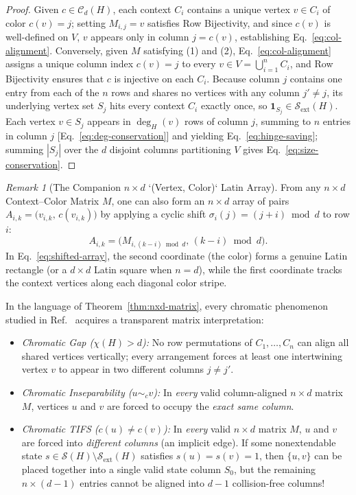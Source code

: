 \documentclass[aps,pra,reprint,superscriptaddress,longbibliography,nofootinbib,floatfix,10pt]{revtex4-2}
\theoremstyle{definition}\newtheorem{definition}[theorem]{Definition}
\theoremstyle{remark}\newtheorem{remark}[theorem]{Remark}
\newcommand{\Sc}{\mathcal S}\newcommand{\Cc}{\mathcal C}
\begin{document}
\begin{proof}
Given $c\in\Cc_d(H)$, each context $C_i$ contains a unique vertex $v\in C_i$ of color $c(v)=j$; setting $M_{i,j}=v$ satisfies Row Bijectivity, and since $c(v)$ is well-defined on $V$, $v$ appears only in column $j=c(v)$, establishing Eq.~\eqref{eq:col-alignment}. Conversely, given $M$ satisfying (1) and (2), Eq.~\eqref{eq:col-alignment} assigns a unique column index $c(v)=j$ to every $v\in V=\bigcup_{i=1}^n C_i$, and Row Bijectivity ensures that $c$ is injective on each $C_i$. Because column $j$ contains one entry from each of the $n$ rows and shares no vertices with any column $j'\neq j$, its underlying vertex set $S_j$ hits every context $C_i$ exactly once, so $\mathbf{1}_{S_j}\in\Sc_{\mathrm{ext}}(H)$. Each vertex $v\in S_j$ appears in $\deg_H(v)$ rows of column $j$, summing to $n$ entries in column $j$ [Eq.~\eqref{eq:deg-conservation}] and yielding Eq.~\eqref{eq:hinge-saving}; summing $|S_j|$ over the $d$ disjoint columns partitioning $V$ gives Eq.~\eqref{eq:size-conservation}.
\end{proof}

\begin{remark}[The Companion $n\times d$ `(Vertex, Color)` Latin Array]\label{rem:vertex-color-array}
From any $n\times d$ Context--Color Matrix $M$, one can also form an $n\times d$ array of pairs $A_{i,k}=\bigl(v_{i,k},\,c(v_{i,k})\bigr)$ by applying a cyclic shift $\sigma_i(j)=(j+i)\bmod d$ to row $i$:
\begin{equation}\label{eq:shifted-array}
A_{i,k}=\bigl(M_{i,(k-i)\bmod d},\,(k-i)\bmod d\bigr).
\end{equation}
In Eq.~\eqref{eq:shifted-array}, the second coordinate (the color) forms a genuine Latin rectangle (or a $d\times d$ Latin square when $n=d$), while the first coordinate tracks the context vertices along each diagonal color stripe.
\end{remark}

In the language of Theorem~\ref{thm:nxd-matrix}, every chromatic phenomenon studied in Ref.~\cite{svozil-2025-color} acquires a transparent matrix interpretation:
\begin{itemize}
\item \emph{Chromatic Gap ($\chi(H)>d$):} No row permutations of $C_1,\ldots,C_n$ can align all shared vertices vertically; every arrangement forces at least one intertwining vertex $v$ to appear in two different columns $j\neq j'$.
\item \emph{Chromatic Inseparability ($u\sim_c v$):} In \emph{every} valid column-aligned $n\times d$ matrix $M$, vertices $u$ and $v$ are forced to occupy the \emph{exact same column}.
\item \emph{Chromatic TIFS ($c(u)\neq c(v)$):} In \emph{every} valid $n\times d$ matrix $M$, $u$ and $v$ are forced into \emph{different columns} (an implicit edge). If some nonextendable state $s\in\Sc(H)\setminus\Sc_{\mathrm{ext}}(H)$ satisfies $s(u)=s(v)=1$, then $\{u,v\}$ can be placed together into a single valid state column $S_0$, but the remaining $n\times(d-1)$ entries cannot be aligned into $d-1$ collision-free columns!
\end{itemize}
\end{document}
